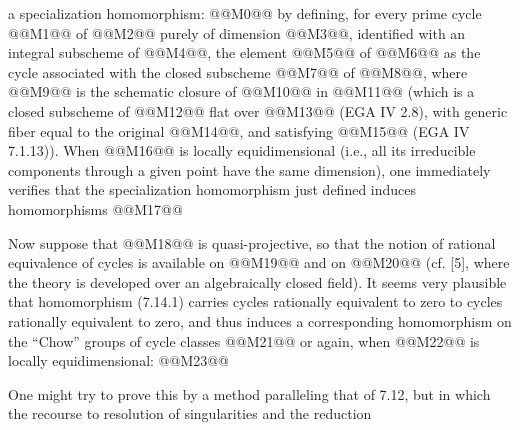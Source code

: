 a specialization homomorphism:
@@M0@@
by defining, for every prime cycle @@M1@@ of @@M2@@ purely of dimension @@M3@@, identified with an integral subscheme of @@M4@@, the element @@M5@@ of @@M6@@ as the cycle associated with the closed subscheme @@M7@@ of @@M8@@, where @@M9@@ is the schematic closure of @@M10@@ in @@M11@@ (which is a closed subscheme of @@M12@@ flat over @@M13@@ (EGA IV 2.8), with generic fiber equal to the original @@M14@@, and satisfying @@M15@@ (EGA IV 7.1.13)). When @@M16@@ is locally equidimensional (i.e., all its irreducible components through a given point have the same dimension), one immediately verifies that the specialization homomorphism just defined induces homomorphisms
@@M17@@

Now suppose that @@M18@@ is quasi-projective, so that the notion of rational equivalence of cycles is available on @@M19@@ and on @@M20@@ (cf. [5], where the theory is developed over an algebraically closed field). It seems very plausible that homomorphism (7.14.1) carries cycles rationally equivalent to zero to cycles rationally equivalent to zero, and thus induces a corresponding homomorphism on the ``Chow'' groups of cycle classes
@@M21@@
or again, when @@M22@@ is locally equidimensional:
@@M23@@

One might try to prove this by a method paralleling that of 7.12, but in which the recourse to resolution of singularities and the reduction
